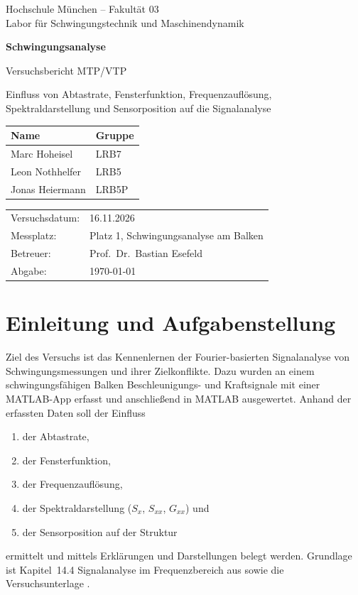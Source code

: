 \documentclass[a4paper,11pt,parskip=half,toc=listof,bibliography=totoc]{scrartcl}
\newcommand{\Sx}{S_{x}}
\newcommand{\Sxx}{S_{xx}}
\newcommand{\Gxx}{G_{xx}}
\begin{document}
\begin{titlepage}
  \centering
  {\large Hochschule München -- Fakultät 03\\
  Labor für Schwingungstechnik und Maschinendynamik\par}
  \vspace{3cm}
  {\Huge\bfseries Schwingungsanalyse\par}
  \vspace{0.6cm}
  {\Large Versuchsbericht MTP/VTP\par}
  \vspace{0.4cm}
  {\large Einfluss von Abtastrate, Fensterfunktion, Frequenzauflösung,\\
  Spektraldarstellung und Sensorposition auf die Signalanalyse\par}
  \vspace{3cm}
  \begin{tabular}{ll}
    \toprule
    Name & Gruppe \\
    \midrule
    Marc Hoheisel    & LRB7  \\
    Leon Nothhelfer  & LRB5  \\
    Jonas Heiermann  & LRB5P \\
    \bottomrule
  \end{tabular}
  \vfill
  \begin{tabular}{ll}
    Versuchsdatum: & 16.11.2026 \\
    Messplatz:     & Platz 1, Schwingungsanalyse am Balken \\
    Betreuer:      & Prof.\ Dr.\ Bastian Esefeld \\
    Abgabe:        & \today
  \end{tabular}
\end{titlepage}

\tableofcontents
\clearpage

\section{Einleitung und Aufgabenstellung}
Ziel des Versuchs ist das Kennenlernen der Fourier-basierten Signalanalyse
von Schwingungsmessungen und ihrer Zielkonflikte. Dazu wurden an einem
schwingungsfähigen Balken Beschleunigungs- und Kraftsignale mit einer
MATLAB-App erfasst und anschließend in MATLAB ausgewertet. Anhand der
erfassten Daten soll der Einfluss
\begin{enumerate}
  \item der Abtastrate,
  \item der Fensterfunktion,
  \item der Frequenzauflösung,
  \item der Spektraldarstellung ($\Sx$, $\Sxx$, $\Gxx$) und
  \item der Sensorposition auf der Struktur
\end{enumerate}
ermittelt und mittels Erklärungen und Darstellungen belegt werden. Grundlage
ist Kapitel~14.4 \glqq Signalanalyse im Frequenzbereich\grqq{} aus
\cite{kuttner} sowie die Versuchsunterlage \cite{esefeld}.
\end{document}
